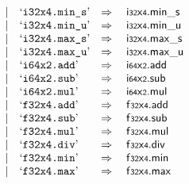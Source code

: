 $$\begin{array}[t]{@{}lrrl@{}l@{}l@{}l@{}}
& & | & \mbox{‘\texttt{i32x4.min\_s}’} & \quad\Rightarrow\quad{} & {\mathsf{i{\scriptstyle 32}}}{\mathsf{x}}{\mathsf{{\scriptstyle 4}}} {.} {\mathsf{min}}{\mathsf{\_}}{\mathsf{s}} \\
& & | & \mbox{‘\texttt{i32x4.min\_u}’} & \quad\Rightarrow\quad{} & {\mathsf{i{\scriptstyle 32}}}{\mathsf{x}}{\mathsf{{\scriptstyle 4}}} {.} {\mathsf{min}}{\mathsf{\_}}{\mathsf{u}} \\
& & | & \mbox{‘\texttt{i32x4.max\_s}’} & \quad\Rightarrow\quad{} & {\mathsf{i{\scriptstyle 32}}}{\mathsf{x}}{\mathsf{{\scriptstyle 4}}} {.} {\mathsf{max}}{\mathsf{\_}}{\mathsf{s}} \\
& & | & \mbox{‘\texttt{i32x4.max\_u}’} & \quad\Rightarrow\quad{} & {\mathsf{i{\scriptstyle 32}}}{\mathsf{x}}{\mathsf{{\scriptstyle 4}}} {.} {\mathsf{max}}{\mathsf{\_}}{\mathsf{u}} \\
& & | & \mbox{‘\texttt{i64x2.add}’} & \quad\Rightarrow\quad{} & {\mathsf{i{\scriptstyle 64}}}{\mathsf{x}}{\mathsf{{\scriptstyle 2}}} {.} \mathsf{add} \\
& & | & \mbox{‘\texttt{i64x2.sub}’} & \quad\Rightarrow\quad{} & {\mathsf{i{\scriptstyle 64}}}{\mathsf{x}}{\mathsf{{\scriptstyle 2}}} {.} \mathsf{sub} \\
& & | & \mbox{‘\texttt{i64x2.mul}’} & \quad\Rightarrow\quad{} & {\mathsf{i{\scriptstyle 64}}}{\mathsf{x}}{\mathsf{{\scriptstyle 2}}} {.} \mathsf{mul} \\
& & | & \mbox{‘\texttt{f32x4.add}’} & \quad\Rightarrow\quad{} & {\mathsf{f{\scriptstyle 32}}}{\mathsf{x}}{\mathsf{{\scriptstyle 4}}} {.} \mathsf{add} \\
& & | & \mbox{‘\texttt{f32x4.sub}’} & \quad\Rightarrow\quad{} & {\mathsf{f{\scriptstyle 32}}}{\mathsf{x}}{\mathsf{{\scriptstyle 4}}} {.} \mathsf{sub} \\
& & | & \mbox{‘\texttt{f32x4.mul}’} & \quad\Rightarrow\quad{} & {\mathsf{f{\scriptstyle 32}}}{\mathsf{x}}{\mathsf{{\scriptstyle 4}}} {.} \mathsf{mul} \\
& & | & \mbox{‘\texttt{f32x4.div}’} & \quad\Rightarrow\quad{} & {\mathsf{f{\scriptstyle 32}}}{\mathsf{x}}{\mathsf{{\scriptstyle 4}}} {.} \mathsf{div} \\
& & | & \mbox{‘\texttt{f32x4.min}’} & \quad\Rightarrow\quad{} & {\mathsf{f{\scriptstyle 32}}}{\mathsf{x}}{\mathsf{{\scriptstyle 4}}} {.} \mathsf{min} \\
& & | & \mbox{‘\texttt{f32x4.max}’} & \quad\Rightarrow\quad{} & {\mathsf{f{\scriptstyle 32}}}{\mathsf{x}}{\mathsf{{\scriptstyle 4}}} {.} \mathsf{max} \\

\end{array}$$

